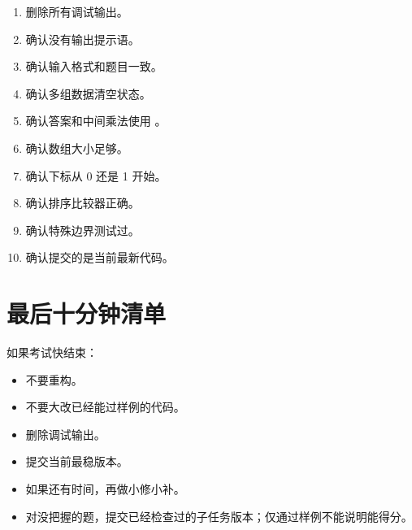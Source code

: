 \begin{enumerate}
  \item 删除所有调试输出。
  \item 确认没有输出提示语。
  \item 确认输入格式和题目一致。
  \item 确认多组数据清空状态。
  \item 确认答案和中间乘法使用 。
  \item 确认数组大小足够。
  \item 确认下标从 0 还是 1 开始。
  \item 确认排序比较器正确。
  \item 确认特殊边界测试过。
  \item 确认提交的是当前最新代码。
\end{enumerate}

\section{最后十分钟清单}\label{sec:10-14}

如果考试快结束：

\begin{itemize}
  \item 不要重构。
  \item 不要大改已经能过样例的代码。
  \item 删除调试输出。
  \item 提交当前最稳版本。
  \item 如果还有时间，再做小修小补。
  \item 对没把握的题，提交已经检查过的子任务版本；仅通过样例不能说明能得分。
\end{itemize}
